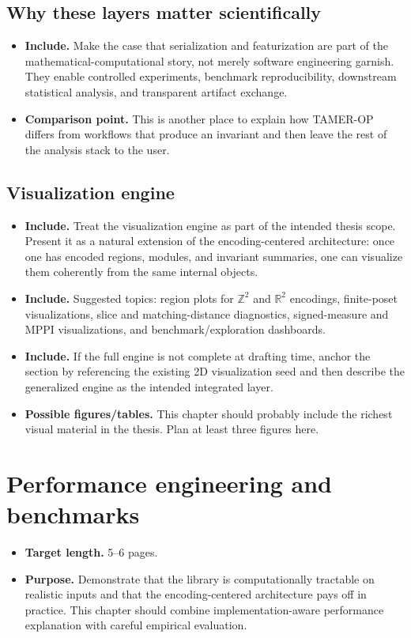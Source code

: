 \documentclass[11pt]{article}
\newcommand{\TAMER}{\textsc{TAMER-OP}}
\newenvironment{plan}{\begin{itemize}[leftmargin=1.6em,itemsep=0.35em,topsep=0.25em]}{\end{itemize}}
\newcommand{\target}[1]{\item \textbf{Target length.} #1}
\newcommand{\purpose}[1]{\item \textbf{Purpose.} #1}
\newcommand{\includeitems}[1]{\item \textbf{Include.} #1}
\newcommand{\figures}[1]{\item \textbf{Possible figures/tables.} #1}
\newcommand{\compare}[1]{\item \textbf{Comparison point.} #1}
\begin{document}
\subsection{Why these layers matter scientifically}

\begin{plan}
    \includeitems{Make the case that serialization and featurization are part of the mathematical-computational story, not merely software engineering garnish. They enable controlled experiments, benchmark reproducibility, downstream statistical analysis, and transparent artifact exchange.}
    \compare{This is another place to explain how \TAMER{} differs from workflows that produce an invariant and then leave the rest of the analysis stack to the user.}
\end{plan}

\subsection{Visualization engine}

\begin{plan}
    \includeitems{Treat the visualization engine as part of the intended thesis scope. Present it as a natural extension of the encoding-centered architecture: once one has encoded regions, modules, and invariant summaries, one can visualize them coherently from the same internal objects.}
    \includeitems{Suggested topics: region plots for $\mathbb{Z}^2$ and $\mathbb{R}^2$ encodings, finite-poset visualizations, slice and matching-distance diagnostics, signed-measure and MPPI visualizations, and benchmark/exploration dashboards.}
    \includeitems{If the full engine is not complete at drafting time, anchor the section by referencing the existing 2D visualization seed and then describe the generalized engine as the intended integrated layer.}
    \figures{This chapter should probably include the richest visual material in the thesis. Plan at least three figures here.}
\end{plan}

\section{Performance engineering and benchmarks}\label{sec:benchmarks}

\begin{plan}
    \target{5--6 pages.}
    \purpose{Demonstrate that the library is computationally tractable on realistic inputs and that the encoding-centered architecture pays off in practice. This chapter should combine implementation-aware performance explanation with careful empirical evaluation.}
\end{plan}
\end{document}
